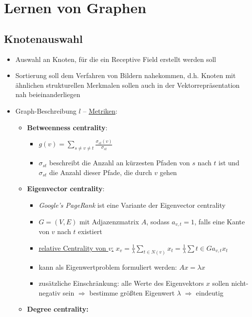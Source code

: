 \section{Lernen von Graphen}

\subsection{Knotenauswahl}

\begin{itemize}
  \item Auswahl an Knoten, für die ein Receptive Field erstellt werden soll
  \item Sortierung soll dem Verfahren von Bildern nahekommen, d.h. Knoten mit ähnlichen strukturellen Merkmalen sollen auch in der Vektorrepräsentation nah beieinanderliegen
  \item Graph-Beschreibung $l$ – \underline{Metriken}:
  \begin{itemize}
    \item \textbf{Betweenness centrality}:
      \begin{itemize}
        \item $g(v) = \sum_{s \neq v \neq t} \frac{\sigma_{st}(v)}{\sigma_{st}}$
        \item $\sigma_{st}$ beschreibt die Anzahl an kürzesten Pfaden von $s$ nach $t$ ist und $\sigma_{st}$ die Anzahl dieser Pfade, die durch $v$ gehen
      \end{itemize}
    \item \textbf{Eigenvector centrality}:
    \begin{itemize}
      \item \emph{Google's PageRank} ist eine Variante der Eigenvector centrality
      \item $G=(V,E)$ mit Adjazenzmatrix $A$, sodass $a_{v,t} = 1$, falls eine Kante von $v$ nach $t$ existiert
      \item \underline{relative Centrality von $v$:} $x_v = \frac{1}{\lambda} \sum_{t \in N(v)} x_t = \frac{1}{\lambda} \sum{t \in G} a_{v,t}x_t$
      \item kann als Eigenwertproblem formuliert werden: $Ax = \lambda x$
      \item zusätzliche Einschränkung: alle Werte des Eigenvektors $x$ sollen nicht-negativ sein $\Rightarrow$ bestimme größten Eigenwert $\lambda$ $\Rightarrow$ eindeutig
    \end{itemize}
    \item \textbf{Degree centrality:}
    \begin{itemize}

\end{itemize}
\end{itemize}
\end{itemize}
